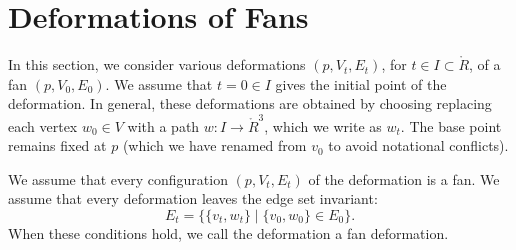 %
%
%
%

\section{Deformations of Fans}

In this section, we consider various deformations $(p,V_t,E_t)$,
for $t\in I\subset \ring{R}$, of
a fan $(p,V_0,E_0)$.  
We assume that $t=0\in I$ gives the initial point
of the deformation.  
In general, these deformations
are obtained by choosing replacing each vertex $w_0\in V$
with a path $w:I\to \ring{R}^3$, which we write as $w_t$.  
The base point remains fixed at $p$ 
(which we have renamed from $v_0$ to
avoid notational conflicts).

We assume that every configuration $(p,V_t,E_t)$ of the 
deformation is a fan.
We assume that every deformation
leaves the edge set invariant:
   \begin{equation}\label{eqn:edge}
   E_t = \{ \{v_t,w_t\} \mid \{v_0,w_0\}\in E_0\}.
   \end{equation}
When these conditions hold, we call the deformation a 
fan deformation.


